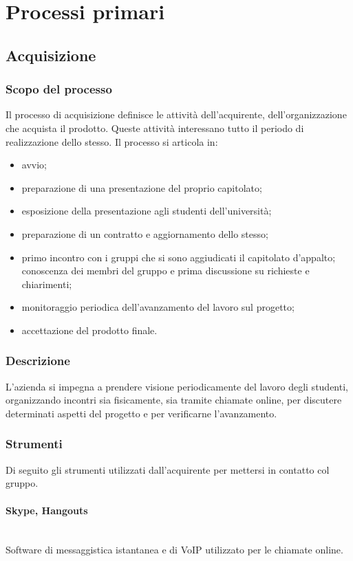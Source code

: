 \section{Processi primari}
\subsection{Acquisizione}
\subsubsection{Scopo del processo}
Il processo di acquisizione definisce le attività dell'acquirente, dell'organizzazione che acquista il prodotto. Queste attività interessano tutto il periodo di realizzazione dello stesso.
Il processo si articola in:
\begin{itemize}
	\item avvio;
	\item preparazione di una presentazione del proprio capitolato;
	\item esposizione della presentazione agli studenti dell'università;
	\item preparazione di un contratto e aggiornamento dello stesso;
	\item primo incontro con i gruppi che si sono aggiudicati il capitolato d'appalto; conoscenza dei membri del gruppo e prima discussione su richieste e chiarimenti;
	\item monitoraggio periodica dell'avanzamento del lavoro sul progetto;
	\item accettazione del prodotto finale.
\end{itemize}
\subsubsection{Descrizione}
L'azienda si impegna a prendere visione periodicamente del lavoro degli studenti, organizzando incontri sia fisicamente, sia tramite chiamate online,
per discutere determinati aspetti del progetto e per verificarne l'avanzamento.
\subsubsection{Strumenti}
Di seguito gli strumenti utilizzati dall'acquirente per mettersi in contatto col gruppo.
\paragraph{Skype, Hangouts} \mbox{}\\
Software di messaggistica istantanea e di VoIP utilizzato per le chiamate online. 
